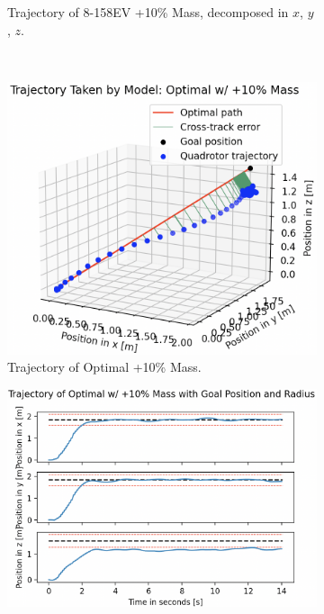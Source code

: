 \begin{figure}[H]
\begin{subfigure}[b]{0.49\textwidth}
         \caption{Trajectory of 8-158EV +10\% Mass, decomposed in $x$, $y$, $z$.}
         \label{fig:testing_robust+10_ppo8158EV2}
     \end{subfigure} 
     \hfill \\[1mm]
    \begin{subfigure}[b]{0.48\textwidth}
         \centering
         \captionsetup{justification=centering}
         \includegraphics[width=\textwidth]{figures/5_/Testing/ppo_test_robust+10-Optimal1.png}
         \caption{Trajectory of Optimal +10\% Mass.}
         \label{fig:testing_robust+10_ppoOptimal1}
     \end{subfigure} 
     \hfill 
     \begin{subfigure}[b]{0.49\textwidth}
         \centering
         \captionsetup{justification=centering}
         \includegraphics[width=\textwidth]{figures/5_/Testing/ppo_test_robust+10-Optimal2.png}

\end{subfigure}
\end{figure}
